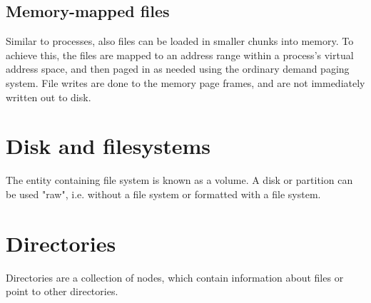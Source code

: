 \subsection{Memory-mapped files}
Similar to processes, also files can be loaded in smaller chunks into memory. To achieve this, the files are mapped to an address range within a process's virtual address space, and then paged in as needed using the ordinary demand paging system. File writes are done to the memory page frames, and are not immediately written out to disk.

\section{Disk and filesystems}
The entity containing file system is known as a volume. A disk or partition can be used "raw", i.e. without a file system or formatted with a file system.

\section{Directories}
Directories are a collection of nodes, which contain information about files or point to other directories.